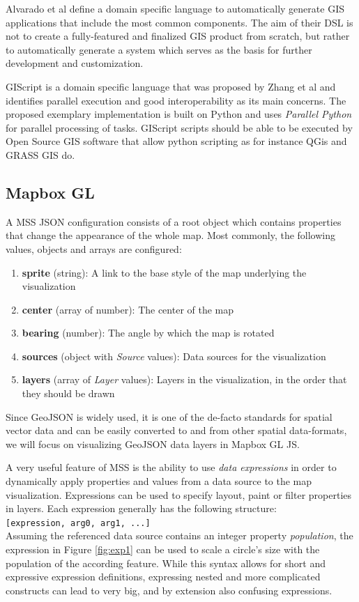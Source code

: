 \documentclass[conference]{IEEEtran}
\begin{document}
Alvarado et al \cite{alvarado2019dsl} define a domain specific language to automatically generate GIS applications that include the most common components. The aim of their DSL is not to create a fully-featured and finalized GIS product from scratch, but rather to automatically generate a  system which serves as the basis for further development and customization.

GIScript is a domain specific language that was proposed by Zhang et al \cite{zhang2014gis} and identifies parallel execution and good interoperability as its main concerns. The proposed exemplary implementation is built on Python and uses \textit{Parallel Python} for parallel processing of tasks. GIScript scripts should be able to be executed by Open Source GIS software that allow python scripting as for instance QGis and GRASS GIS do.

\subsection{Mapbox GL}

A MSS JSON configuration consists of a root object which contains properties that change the appearance of the whole map. Most commonly, the following values, objects and arrays are configured: 

\begin{enumerate}
    \item \textbf{sprite} (string): A link to the base style of the map underlying the visualization
    \item \textbf{center} (array of number): The center of the map
    \item \textbf{bearing} (number): The angle by which the map is rotated
    \item \textbf{sources} (object with \textit{Source} values): Data sources for the visualization
    \item \textbf{layers} (array of \textit{Layer} values): Layers in the visualization, in the order that they should be drawn
\end{enumerate}

Since GeoJSON is widely used, it is one of the de-facto standards for spatial vector data and can be easily converted to and from other spatial data-formats\cite{dixson2020geojson}, we will focus on visualizing GeoJSON data layers in Mapbox GL JS.

A very useful feature of MSS is the ability to use \textit{data expressions} in order to dynamically apply properties and values from a data source to the map visualization. Expressions can be used to specify layout, paint or filter properties in layers. Each expression generally has the following structure: 
\\
\lstinline{[expression, arg0, arg1, ...]}
\\
Assuming the referenced data source contains an integer property \textit{population}, the expression in Figure \ref{fig:exp1} can be used to scale a circle's size with the population of the according feature. While this syntax allows for short and expressive expression definitions, expressing nested and more complicated constructs can lead to very big, and by extension also confusing expressions.
\end{document}
